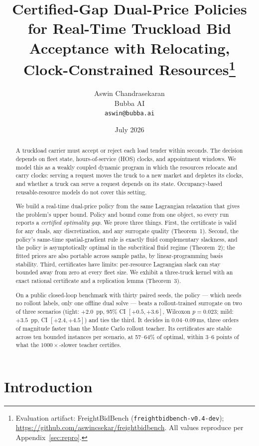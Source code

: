 \documentclass[11pt]{article}
\title{Certified-Gap Dual-Price Policies for Real-Time Truckload Bid
Acceptance with Relocating, Clock-Constrained
Resources\thanks{Evaluation artifact: FreightBidBench
(\texttt{freightbidbench-v0.4-dev});
\url{https://github.com/aswincsekar/freightbidbench}. All values
reproduce per Appendix~\ref{sec:repro}.}}
\author{Aswin Chandrasekaran \\ Bubba AI \\ \texttt{aswin@bubba.ai}}
\date{July 2026}
\begin{document}
\maketitle

\begin{abstract}
A truckload carrier must accept or reject each load tender within
seconds. The decision depends on fleet state, hours-of-service (HOS)
clocks, and appointment windows. We model this as a weakly coupled
dynamic program in which the resources relocate and carry clocks:
serving a request moves the truck to a new market and depletes its
clocks, and whether a truck can serve a request depends on its state.
Occupancy-based reusable-resource models do not cover this setting.

We build a real-time dual-price policy from the same Lagrangian
relaxation that gives the problem's upper bound. Policy and bound come
from one object, so every run reports a \emph{certified optimality
gap}. We prove three things. First, the certificate is valid for any
duals, any discretization, and any surrogate quality (Theorem~1).
Second, the policy's same-time spatial-gradient rule is exactly fluid
complementary slackness, and the policy is asymptotically optimal in
the subcritical fluid regime (Theorem~2); the fitted prices are also
portable across sample paths, by linear-programming basis stability.
Third, certificates have limits: per-resource Lagrangian slack can stay
bounded away from zero at every fleet size. We exhibit a three-truck
kernel with an exact rational certificate and a replication lemma
(Theorem~3).

On a public closed-loop benchmark with thirty paired seeds, the policy
--- which needs no rollout labels, only one offline dual solve --- beats
a rollout-trained surrogate on two of three
scenarios (tight: $+2.0$~pp, 95\% CI $[+0.5, +3.6]$, Wilcoxon
$p = 0.023$; mild: $+3.5$~pp, CI $[+2.4, +4.5]$) and ties the third.
It decides in 0.04--0.09\,ms, three orders of magnitude faster than
the Monte Carlo rollout teacher. Its certificates are stable across ten
bounded instances per scenario, at 57--64\% of optimal, within 3--6
points of what the $1000\times$-slower teacher certifies.
\end{abstract}

\section{Introduction}
\label{sec:intro}
\end{document}
